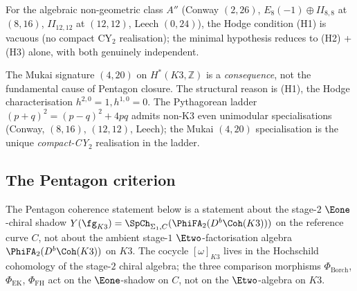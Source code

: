 \begin{remark}
\label{rem:mhv70-algebraic}
For the algebraic non-geometric class $A''$
\textup{(}Conway $(2, 26)$, $E_8(-1) \oplus II_{8,8}$ at $(8, 16)$,
$II_{12,12}$ at $(12, 12)$, Leech $(0, 24)$\textup{)}, the
Hodge condition \textup{(H1)} is vacuous \textup{(}no compact CY$_2$
realisation\textup{);} the minimal hypothesis reduces to
\textup{(H2) + (H3)} alone, with both genuinely independent.
\end{remark}

\begin{remark}
\label{rem:mukai-signature-downstream}
The Mukai signature $(4, 20)$ on $H^*(K3, \mathbb{Z})$ is a
\emph{consequence}, not the fundamental cause of Pentagon closure.
The structural reason is \textup{(H1)}, the Hodge characterisation
$h^{2,0} = 1, h^{1,0} = 0$. The Pythagorean ladder
$(p+q)^2 = (p-q)^2 + 4pq$ admits non-K$3$ even unimodular
specialisations \textup{(}Conway, $(8, 16)$, $(12, 12)$,
Leech\textup{);} the Mukai $(4, 20)$ specialisation is the unique
\emph{compact-CY$_2$} realisation in the ladder.
\end{remark}

\subsection{The Pentagon criterion}
\label{subsec:k3-pentagon-edge-architecture}

\begin{remark}
\label{rem:k3y-stage-pentagon}
The Pentagon coherence statement below is a statement about the
stage-$2$ $\Eone$-chiral shadow $Y(\fg_{K3}) =
\SpCh_{\Sigma_1, C}(\PhiFA_2(D^b\Coh(K3)))$ on the reference curve
$C$, not about the ambient stage-$1$ $\Etwo$-factorisation algebra
$\PhiFA_2(D^b\Coh(K3))$ on $K3$. The cocycle $[\omega]_{K3}$ lives
in the Hochschild cohomology of the stage-$2$ chiral algebra; the
three comparison morphisms $\Phi_{\mathrm{Borch}}$, $\Phi_{\mathrm{EK}}$,
$\Phi_{\mathrm{FH}}$ act on the $\Eone$-shadow on $C$, not on the
$\Etwo$-algebra on $K3$.
\end{remark}


